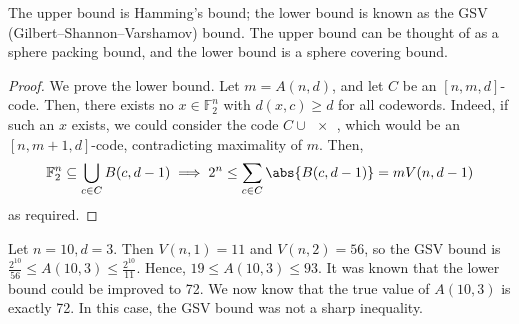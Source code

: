 The upper bound is Hamming's bound; the lower bound is known as the GSV (Gilbert--Shannon--Varshamov) bound.
The upper bound can be thought of as a sphere packing bound, and the lower bound is a sphere covering bound.

\begin{proof}
    We prove the lower bound.
    Let $m = A(n,d)$, and let $C$ be an $[n,m,d]$-code.
    Then, there exists no $x \in \mathbb F_2^n$ with $d(x,c) \geq d$ for all codewords.
    Indeed, if such an $x$ exists, we could consider the code $C \cup \qty{x}$, which would be an $[n,m+1,d]$-code, contradicting maximality of $m$.
    Then,
    \begin{align*}
        \mathbb F_2^n \subseteq \bigcup_{c \in C} B(c,d-1) \implies 2^n \leq \sum_{c \in C} \abs{B(c,d-1)} = mV(n,d-1)
    \end{align*}
    as required.
\end{proof}
\begin{example}
    Let $n = 10, d = 3$.
    Then $V(n,1) = 11$ and $V(n,2) = 56$, so the GSV bound is $\frac{2^{10}}{56} \leq A(10,3) \leq \frac{2^{10}}{11}$.
    Hence, $19 \leq A(10,3) \leq 93$.
    It was known that the lower bound could be improved to 72.
    We now know that the true value of $A(10,3)$ is exactly 72.
    In this case, the GSV bound was not a sharp inequality.
\end{example}

